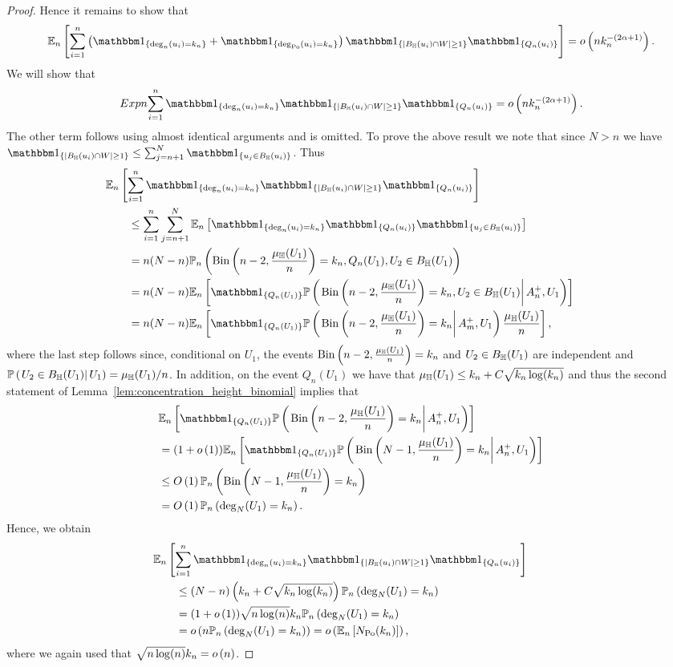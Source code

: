 \begin{proof}
Hence it remains to show that 
\[
	\Expn{\sum_{i = 1}^n \left(\ind{\deg_n(u_i) = k_n} + \ind{\deg_\Po(u_i) = k_n} \right)
			\ind{|B_\H(u_i) \cap W| \ge 1}\ind{Q_n(u_i)}} = \smallO{n k_n^{-(2\alpha + 1)}}.
\] 
We will show that
\[
	Expn{\sum_{i = 1}^n \ind{\deg_n(u_i) = k_n}
				\ind{|B_\H(u_i) \cap W| \ge 1}\ind{Q_n(u_i)}} = \smallO{n k_n^{-(2\alpha + 1)}}.
\]
The other term follows using almost identical arguments and is omitted. To prove the above result we note that since $N > n$ we have $\ind{|B_\H(u_i) \cap W| \ge 1} \le \sum_{j = n + 1}^N \ind{u_j \in B_\H(u_i)}$. Thus
\begin{align*}
	&\hspace{-20pt}\Expn{\sum_{i = 1}^n \ind{\deg_n(u_i) = k_n}\ind{|B_\H(u_i) \cap W| \ge 1}\ind{Q_n(u_i)}}\\
	&\le\sum_{i = 1}^n \sum_{j = n+1}^N \Expn{\ind{\deg_n(u_i) = k_n}\ind{Q_n(u_i)}\ind{u_j \in B_\H(u_i)}}\\
	&= n(N-n) \Probn{\mathrm{Bin}\left(n-2, \frac{\mu_\H(U_1)}{n}\right) = k_n, Q_n(U_1), U_2 \in B_\H(U_1)}\\
	&= n(N-n) 
		\Expn{\ind{Q_n(U_1)}
			\CProb{\mathrm{Bin}\left(n-2, \frac{\mu_\H(U_1)}{n}\right) = k_n, U_2 \in B_\H(U_1)}{A_n^+, U_1}}\\
	&= n(N-n)
		\Expn{\ind{Q_n(U_1)}\CProb{\mathrm{Bin}\left(n-2, \frac{\mu_\H(U_1)}{n}\right) = k_n}{A_m^+, U_1} \frac{\mu_{\H}(U_1)}{n}},
\end{align*}
where the last step follows since, conditional on $U_1$, the events $\mathrm{Bin}\left(n-2, \frac{\mu_{\mathbb{H}}(U_1)}{n}\right) = k_n$ and $U_2\in B_{\mathbb{H}}(U_1)$ are independent and $\mathbb{P}\left(\left.U_2\in B_{\mathbb{H}}(U_1)\right|U_1\right) = \mu_{\mathbb{H}}(U_1)/n$. In addition, on the event $Q_n(U_1)$ we have that $\mu_{\mathbb{H}}(U_1) \le k_n + C \sqrt{k_n \log(k_n)}$ and thus the second statement of Lemma~\ref{lem:concentration_height_binomial} implies that
\begin{align*}
	&\Expn{\ind{Q_n(U_1)}\CProb{\mathrm{Bin}\left(n-2, \frac{\mu_\H(U_1)}{n}\right) = k_n}{A_n^+, U_1}}\\
	&= (1+\smallO{1})\Expn{\ind{Q_n(U_1)}\CProb{\mathrm{Bin}\left(N-1, \frac{\mu_\H(U_1)}{n}\right) = k_n}{A_n^+, U_1}}\\
	&\le \bigO{1}\Probn{\mathrm{Bin}\left(N-1, \frac{\mu_\H(U_1)}{n}\right) = k_n}\\
	&= \bigO{1}\Probn{\deg_N(U_1) = k_n}.
\end{align*}
Hence, we obtain
\begin{align*}
	&\hspace{-20pt}\Expn{\sum_{i = 1}^n \ind{\deg_n(u_i) = k_n}\ind{|B_\H(u_i) \cap W| \ge 1}\ind{Q_n(u_i)}}\\
	&\le (N-n)\left(k_n + C \sqrt{k_n \log(k_n)}\right) \Probn{\deg_N(U_1) = k_n}\\
	&= (1+\smallO{1}) \sqrt{n \log(n)} k_n \Probn{\deg_N(U_1) = k_n}\\
	&= \smallO{n \Probn{\deg_N(U_1) = k_n}} = \smallO{\Expn{N_\Po(k_n)}},
\end{align*}
where we again used that $\sqrt{n \log(n)} k_n = o\left(n\right)$.
\end{proof}

